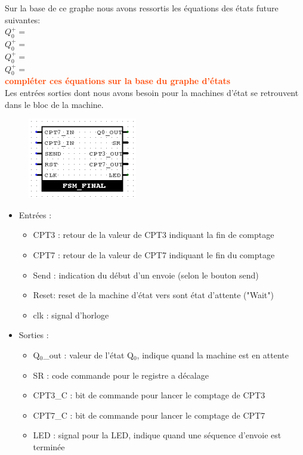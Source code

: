 \documentclass[a4paper]{article} %
\newcommand{\red}[1]{\textbf{\textcolor{OrangeRed}{#1}}}
\begin{document}
\begin{tcolorbox}[colframe=Monokaimagenta,colback=white, breakable, enhanced]
Sur la base de ce graphe nous avons ressortis les équations des états future suivantes:\\
$Q_0^+ = $\\
$Q_0^+ = $\\
$Q_0^+ = $\\
$Q_0^+ = $\\
\red{compléter ces équations sur la base du graphe d'états}\\

Les entrées sorties dont nous avons besoin pour la machines d'état se retrouvent dans le bloc de la machine.
\begin{figure}[H]
	\centering
	\includegraphics[scale = 0.8]{src/bloc_FSM}
	\label{fig:bloc_FSM}
\end{figure}

\begin{itemize}
	\item Entrées :
	\begin{itemize}
		\item CPT3 : retour de la valeur de CPT3 indiquant la fin de comptage
		\item CPT7 : retour de la valeur de CPT7 indiquant le fin du comptage
		\item Send : indication du début d'un envoie (selon le bouton send)
		\item Reset: reset de la machine d'état vers sont état d'attente ("Wait")
		\item clk  : signal d'horloge
	\end{itemize}
	\item Sorties :
	\begin{itemize}
		\item Q$_0$\_out : valeur de l'état Q$_0$, indique quand la machine est en attente
		\item SR		 : code commande pour le registre a décalage
		\item CPT3\_C  	 : bit de commande pour lancer le comptage de CPT3
		\item CPT7\_C	 : bit de commande pour lancer le comptage de CPT7
		\item LED        : signal pour la LED, indique quand une séquence d'envoie est terminée
	\end{itemize}
\end{itemize}


\end{tcolorbox}
\end{document}
